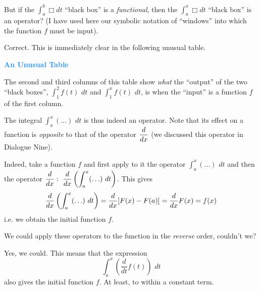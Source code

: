 \rdr But if the $\displaystyle\int_{a}^{b} \Box dt$ ``black box'' is a \emph{functional}, then the $\displaystyle\int_{a}^{x} \Box dt$ ``black box'' is an operator? (I have used
here our symbolic notation of ``windows'' into which the function $f$ must be input).

\athr Correct. This is immediately clear in the following unusual table.

\begin{center}
\textcolor{DodgerBlue}{\textbf{An Unusual Table}}\\[20pt]
{}
\end{center}
The second and third columns of this table show \emph{what} the
``output'' of the two ``black boxes'',  $\displaystyle\int_{1}^{2} f(t) \,\, dt$ and  $\displaystyle\int_{1}^{x} f(t) \,\, dt$, is when the ``input'' is a function $f$ of the first column.

The integral $\displaystyle\int_{a}^{x} (\ldots) \,\, dt$ is thus indeed an operator. Note that its effect on a function is \emph{opposite} to that of the operator $\dfrac{d}{dx}$ (we discussed this operator in Dialogue Nine).

Indeed, take a function $f$ and first apply to it the operator $\displaystyle\int_{a}^{x} (\ldots) \,\, dt$ and then the operator $\dfrac{d}{dx}: \,\, \dfrac{d}{dx} \left( \displaystyle\int_{a}^{x} (\ldots) \,\, dt \right) $.
This gives
\begin{equation*}%
\ddx \left( \int_{a}^{x} (\ldots) \,\, dt \right) = \ddx [F(x) - F(a)]  = \ddx F(x) = f(x)	
\end{equation*}
i.e. we obtain the initial function $f$. 

\rdr We could apply these operators to the function in the \emph{reverse} order, couldn't we?

\athr Yes, we could. This means that the expression
\begin{equation*}%
 \int_{a}^{x} \left( \dfrac{d}{dt} f(t) \right) \,\, dt
\end{equation*}
also gives the initial function $f$. At least, to within a constant term.

